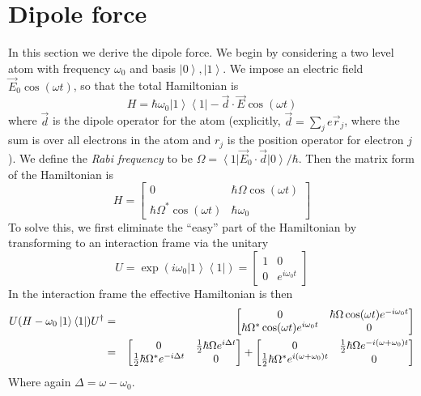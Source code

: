 \documentclass[aps,prb,floatfix,amsmath,amssymb,groupedaddress]{revtex4}
\begin{document}
\section{Dipole force}
In this section we derive the dipole force.  We begin by considering a two level atom with frequency $\omega_0$ and basis $\left|0\right>, \left|1\right>$.  We impose an electric field $\vec{E}_0\cos(\omega t)$, so that the total Hamiltonian is $$H = \hbar \omega_0 \left|1\right>\left<1\right| - \vec{d}\cdot\vec{E}\cos(\omega t)$$ where $\vec{d}$ is the dipole operator for the atom (explicitly, $\vec{d} = \sum_j e \vec{r}_j$, where the sum is over all electrons in the atom and $r_j$ is the position operator for electron $j$).  We define the \textit{Rabi frequency} to be $\Omega = \left<1\right| \vec{E}_0\cdot \vec{d} \left| 0\right>/\hbar$.  Then the matrix form of the Hamiltonian is $$H = 
\begin{bmatrix}
0 & \hbar\Omega \cos(\omega t) \\
\hbar \Omega^* \cos(\omega t) & \hbar \omega_0 
\end{bmatrix}
$$
To solve this, we first eliminate the ``easy'' part of the Hamiltonian by transforming to an interaction frame via the unitary $$U = \exp\left(i\omega_0 \left|1\right>\left<1\right|\right) = 
\begin{bmatrix}
1 & 0 \\
0 & e^{i\omega_0 t}
\end{bmatrix}
$$ 
In the interaction frame the effective Hamiltonian is then 
\begin{eqnarray*} U(H-\omega_0 \left|1\right>\left<1\right|)U^\dagger & = & 
\begin{bmatrix}
0 & \hbar\Omega \cos(\omega t) e^{-i\omega_0 t} \\
\hbar \Omega^* \cos(\omega t) e^{i\omega_0 t} & 0
\end{bmatrix} \\
& = & 
\begin{bmatrix}
0 & {\frac{1}{2}} \hbar\Omega e^{i\Delta t} \\
{\frac{1}{2}}\hbar \Omega^* e^{-i\Delta t} & 0
\end{bmatrix}
+ 
\begin{bmatrix}
0 & {\frac{1}{2}} \hbar\Omega e^{-i(\omega + \omega_0) t} \\
{\frac{1}{2}} \hbar \Omega^* e^{i(\omega + \omega_0) t} & 0
\end{bmatrix} \\
\end{eqnarray*}
Where again $\Delta=\omega - \omega_0$.
\end{document}
